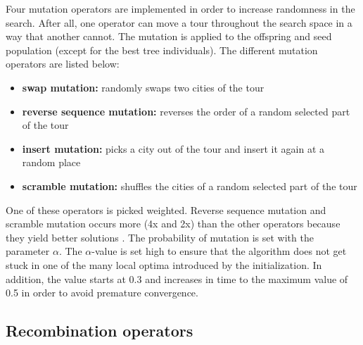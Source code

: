 \documentclass[a4paper,10pt]{article}
\newcommand{\ReplaceMe}[1]{{\color{blue}#1}}
\begin{document}
Four mutation operators are implemented in order to increase randomness in the search. After all, one operator can move a tour throughout the search space in a way that another cannot. The mutation is applied to the offspring and seed population (except for the best tree individuals). The different mutation operators are listed below:
\begin{itemize}
  \item \textbf{swap mutation:} randomly swaps two cities of the tour
  \item \textbf{reverse sequence mutation:} reverses the order of a random selected part of the tour
  \item \textbf{insert mutation:} picks a city out of the tour and insert it again at a random place
  \item \textbf{scramble mutation:} shuffles the cities of a random selected part of the tour
\end{itemize}
One of these operators is picked weighted. Reverse sequence mutation and scramble mutation occurs more (4x and 2x) than the other operators because they yield better solutions \cite{mutationperformance}.
The probability of mutation is set with the parameter $\alpha$. The $\alpha$-value is set high to ensure that the algorithm does not get stuck in one of the many local optima introduced by the initialization. In addition, the value starts at 0.3 and increases in time to the maximum value of 0.5 in order to avoid premature convergence. 

\subsection{Recombination operators}\label{ssec:recombination}

\end{document}
